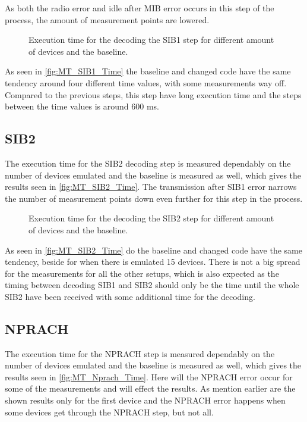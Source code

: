 As both the radio error and idle after MIB error occurs in this step of the process, the amount of measurement points are lowered.

\begin{figure}[H]
\centering
\resizebox{0.5\textwidth}{!}{
}
\caption{Execution time for the decoding the SIB1 step for different amount of devices and the baseline.}
\label{fig:MT_SIB1_Time}
\end{figure}

As seen in \autoref{fig:MT_SIB1_Time} the baseline and changed code have the same tendency around four different time values, with some measurements way off. Compared to the previous steps, this step have long execution time and the steps between the time values is around 600 ms.

\subsection{SIB2}
The execution time for the SIB2 decoding step is measured dependably on the number of devices emulated and the baseline is measured as well, which gives the results seen in \autoref{fig:MT_SIB2_Time}. The transmission after SIB1 error narrows the number of measurement points down even further for this step in the process.

\begin{figure}[H]
\centering
\resizebox{0.5\textwidth}{!}{
}
\caption{Execution time for the decoding the SIB2 step for different amount of devices and the baseline.}
\label{fig:MT_SIB2_Time}
\end{figure}


As seen in \autoref{fig:MT_SIB2_Time} do the baseline and changed code have the same tendency, beside for when there is emulated 15 devices. There is not a big spread for the measurements for all the other setups, which is also expected as the timing between decoding SIB1 and SIB2 should only be the time until the whole SIB2 have been received with some additional time for the decoding.

\subsection{NPRACH}
The execution time for the NPRACH step is measured dependably on the number of devices emulated and the baseline is measured as well, which gives the results seen in \autoref{fig:MT_Nprach_Time}. Here will the NPRACH error occur for some of the measurements and will effect the results. As mention earlier are the shown results only for the first device and the NPRACH error happens when some devices get through the NPRACH step, but not all.

